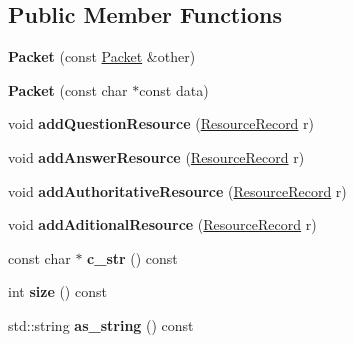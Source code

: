\subsection*{Public Member Functions}
\begin{DoxyCompactItemize}
\item 
{\bfseries Packet} (const \hyperlink{structdns_1_1Packet}{Packet} \&other)\hypertarget{structdns_1_1Packet_a7cc92466b5291c0f4773092084836495}{}\label{structdns_1_1Packet_a7cc92466b5291c0f4773092084836495}

\item 
{\bfseries Packet} (const char $\ast$const data)\hypertarget{structdns_1_1Packet_a90c293bc5bc7bad9c47be19d6060b82a}{}\label{structdns_1_1Packet_a90c293bc5bc7bad9c47be19d6060b82a}

\item 
void {\bfseries add\+Question\+Resource} (\hyperlink{structdns_1_1ResourceRecord}{Resource\+Record} r)\hypertarget{structdns_1_1Packet_ac9e9b7e48afc984d949b0062feef13fe}{}\label{structdns_1_1Packet_ac9e9b7e48afc984d949b0062feef13fe}

\item 
void {\bfseries add\+Answer\+Resource} (\hyperlink{structdns_1_1ResourceRecord}{Resource\+Record} r)\hypertarget{structdns_1_1Packet_aa5e426126e1b03f0ca2e874bd7453864}{}\label{structdns_1_1Packet_aa5e426126e1b03f0ca2e874bd7453864}

\item 
void {\bfseries add\+Authoritative\+Resource} (\hyperlink{structdns_1_1ResourceRecord}{Resource\+Record} r)\hypertarget{structdns_1_1Packet_ac7aac0fb6f1d988b6e74f6dae4c0dd8a}{}\label{structdns_1_1Packet_ac7aac0fb6f1d988b6e74f6dae4c0dd8a}

\item 
void {\bfseries add\+Aditional\+Resource} (\hyperlink{structdns_1_1ResourceRecord}{Resource\+Record} r)\hypertarget{structdns_1_1Packet_a384c1b1338b232cd10808b8e94817a98}{}\label{structdns_1_1Packet_a384c1b1338b232cd10808b8e94817a98}

\item 
const char $\ast$ {\bfseries c\+\_\+str} () const \hypertarget{structdns_1_1Packet_abe5254f0b79f2f3d41cee8a1b6654c6d}{}\label{structdns_1_1Packet_abe5254f0b79f2f3d41cee8a1b6654c6d}

\item 
int {\bfseries size} () const \hypertarget{structdns_1_1Packet_a8edc861125aa062b29793fa0c5ff435a}{}\label{structdns_1_1Packet_a8edc861125aa062b29793fa0c5ff435a}

\item 
std\+::string {\bfseries as\+\_\+string} () const \hypertarget{structdns_1_1Packet_ac8d0b87762ca208e97da4d0dddd39adb}{}\label{structdns_1_1Packet_ac8d0b87762ca208e97da4d0dddd39adb}

\end{DoxyCompactItemize}
